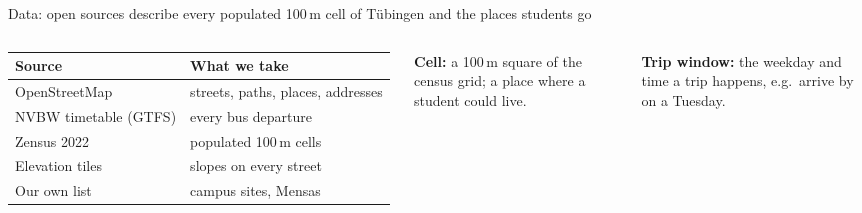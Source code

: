 \documentclass[aspectratio=169,10pt]{beamer}
\begin{document}
\begin{frame}{Data: open sources describe every populated 100\,m cell of Tübingen and the places
  students go}
  \begin{columns}[T,onlytextwidth]
      \footnotesize
      \begin{tabular}{@{}>{\raggedright\arraybackslash}p{30mm}>{\raggedright\arraybackslash}p{43mm}@{}}
        \toprule
        \textbf{Source} & \textbf{What we take} \\
        \midrule
        OpenStreetMap & streets, paths, places, addresses \\
        NVBW timetable (GTFS) & every bus departure \\
        Zensus 2022 & populated 100\,m cells \\
        Elevation tiles & slopes on every street \\
        Our own list & campus sites, Mensas \\
        \bottomrule
      \end{tabular}
      \footnotesize
      \textbf{Cell:} a 100\,m square of the census grid; a place where a student could
      live.\par\medskip
      \textbf{Trip window:} the weekday and time a trip happens, e.g.\ arrive by
      \factMorningArrive{} on a Tuesday.
  \end{columns}
\end{frame}
\end{document}
